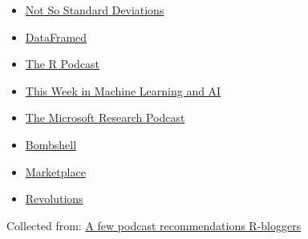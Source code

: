 \documentclass[]{book}
\providecommand{\tightlist}{%
  \setlength{\itemsep}{0pt}\setlength{\parskip}{0pt}}
\theoremstyle{definition}
\theoremstyle{definition}
\theoremstyle{definition}
\theoremstyle{remark}
\begin{document}
\begin{itemize}
\tightlist
\item
  \href{http://nssdeviations.com/}{Not So Standard Deviations}
\item
  \href{https://www.datacamp.com/community/podcast?tap_a=5644-dce66f\&tap_s=10907-287229}{DataFramed}
\item
  \href{https://r-podcast.org/}{The R Podcast}
\item
  \href{https://twimlai.com/}{This Week in Machine Learning and AI}
\item
  \href{https://www.microsoft.com/en-us/research/blog/category/podcast/}{The
  Microsoft Research Podcast}
\item
  \href{https://warontherocks.com/category/podcasts/bombshell/}{Bombshell}
\item
  \href{https://www.marketplace.org/}{Marketplace}
\item
  \href{http://www.revolutionspodcast.com/}{Revolutions}
\end{itemize}

Collected from:
\href{https://www.r-bloggers.com/a-few-podcast-recommendations/}{A few
podcast recommendations \textbar{} R-bloggers}
\end{document}
